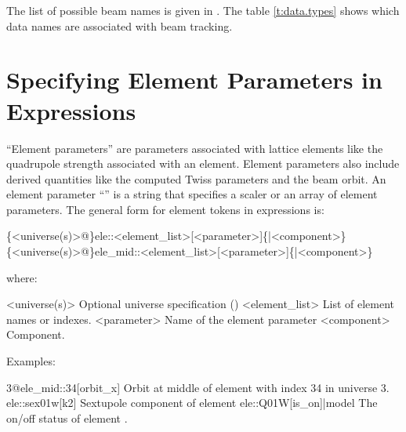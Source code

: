 The list of possible beam  names is given in . The table
\ref{t:data.types} shows which data names are associated with beam tracking.

\section{Specifying Element Parameters in Expressions}
\label{s:ele.token}

``Element parameters'' are parameters associated with lattice elements like the quadrupole
strength associated with an element. Element parameters also include derived quantities
like the computed Twiss parameters and the beam orbit. An element parameter ``''
is a string that specifies a scaler or an array of element parameters. The general form
for element tokens in expressions is:
\begin{example}
  \{<universe(s)>@\}ele::<element_list>[<parameter>]\{|<component>\}
  \{<universe(s)>@\}ele_mid::<element_list>[<parameter>]\{|<component>\}
\end{example}
where:
\begin{example}
  <universe(s)>       Optional universe specification ()
  <element_list>      List of element names or indexes.
  <parameter>         Name of the element parameter
  <component>         Component. 
\end{example}
Examples:
\begin{example}
  3@ele_mid::34[orbit_x]     Orbit at middle of element with index 34 in universe 3.
  ele::sex01w[k2]            Sextupole component of element 
  ele::Q01W[is_on]|model     The on/off status of element .
\end{example}

